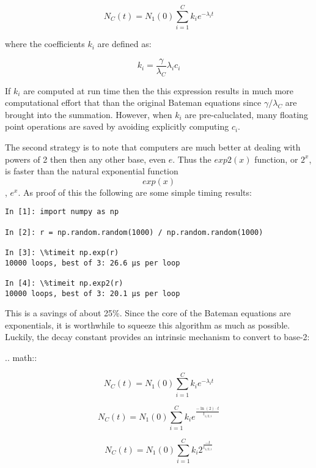 \documentclass{anstrans}
\begin{document}
\begin{equation}
\label{N_C_bin}
N_C(t) = N_1(0) \sum_{i=1}^C k_{i} e^{-\lambda_i t}
\end{equation}

where the coefficients $k_i$ are defined as:

\begin{equation}
\label{k_i}
k_i = \frac{\gamma}{\lambda_C} \lambda_i c_i
\end{equation}

If $k_i$ are computed at run time then the this expression results in much 
more computational effort that than the original Bateman equations since $\gamma/\lambda_C$ 
are brought into the summation. However, when $k_i$ are pre-caluclated, 
many floating point operations are saved by avoiding explicitly computing $c_i$.

The second strategy is to note that computers are much better at dealing with powers of
2 then then any other base, even $e$. Thus the $exp2(x)$ function, or $2^x$,
is faster than the natural exponential function $$exp(x)$$, $e^x$.  As proof of this
the following are some simple timing results:

\begin{lstlisting}[caption={Exponential Timing Comparison}, 
                   label=expcmp]
In [1]: import numpy as np

In [2]: r = np.random.random(1000) / np.random.random(1000)

In [3]: \%timeit np.exp(r)
10000 loops, best of 3: 26.6 µs per loop

In [4]: \%timeit np.exp2(r)
10000 loops, best of 3: 20.1 µs per loop
\end{lstlisting}

This is a savings of about 25\%.  Since the core of the Bateman equations are exponentials, 
it is worthwhile to squeeze this algorithm as much as possible.  Luckily, the decay constant
provides an intrinsic mechanism to convert to base-2:

.. math::

\begin{equation}
\label{b2-0}
N_C(t) = N_1(0) \sum_{i=1}^C k_{i} e^{-\lambda_i t}
\end{equation}

\begin{equation}
\label{b2-1}
N_C(t) = N_1(0) \sum_{i=1}^C k_{i} e^{\frac{-\ln(2)\cdot t}{t_{1/2,i}}}
\end{equation}

\begin{equation}
\label{b2-2}
N_C(t) = N_1(0) \sum_{i=1}^C k_{i} 2^{\frac{-t}{t_{1/2,i}}}
\end{equation}
\end{document}
